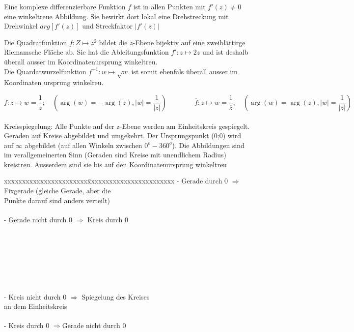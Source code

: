 Eine komplexe differenzierbare Funktion $f$ ist in allen Punkten mit
$f'(z)\neq0$ eine winkeltreue Abbildung. Sie bewirkt dort lokal eine
Drehstreckung mit Drehwinkel $arg\left[f'(z)\right]$ und Streckfaktor
$\left|f'(z)\right|$

Die Quadratfunktion $f:Z\mapsto z^2$ bildet die $z$-Ebene bijektiv auf eine
zweiblättirge Riemamsche Fläche ab. Sie hat die Ableitungsfunktion
$f':z\mapsto 2z$ und ist deshalb überall ausser im Koordinatenursprung
winkeltreu.\\
Die Quardatwurzelfunktion $f^{-1}:w \mapsto \sqrt{w}$ ist somit ebenfals überall
ausser im Koordinaten ursprung winkelreu.

  $$ f : z \mapsto w = \frac{1}{z}; \quad (\arg(w) = -\arg(z), |w| = \frac{1}{|z|})
  \qquad \qquad 
  \overline{f}: z \mapsto w = \frac{1}{\overline{z}};  \quad  
  (\arg(w) = \arg(z), |w| = \frac{1}{|z|}) $$\\
  Kreisspiegelung: Alle Punkte auf der z-Ebene werden am Einheitskreis gespiegelt.
  Geraden auf Kreise abgebildet und umgekehrt. Der Ursprungspunkt (0;0) wird auf
  $ \infty $ abgebildet (auf allen Winkeln zwischen $0^o-360^o$). Die
  Abbildungen sind
  im verallgemeinerten Sinn (Geraden sind Kreise mit unendlichem Radius)
  kreistreu. Ausserdem sind sie bis auf den Koordinatenursprung winkeltreu\\
  \begin{minipage}{9cm}
    \begin{tabbing}
          xxxxxxxxxxxxxxxxxxxxxxx\=xxxxxxxxxxxxxxxxxxxxxxxx\kill
          - Gerade durch 0 $\Longrightarrow$ \>Fixgerade (gleiche Gerade, aber
          die \\ \>Punkte darauf sind anders verteilt)\\ \\
      - Gerade nicht durch 0 $\Longrightarrow$ Kreis durch 0\\ \\ \\ \\ \\ \\ \\ \\
      - Kreis nicht durch 0 $\Longrightarrow$ \>Spiegelung des Kreises\\ \> an dem
      Einheitskreis\\ \\
      - Kreis durch 0 $\Longrightarrow$\>Gerade nicht durch 0
        \end{tabbing}
  \end{minipage}
